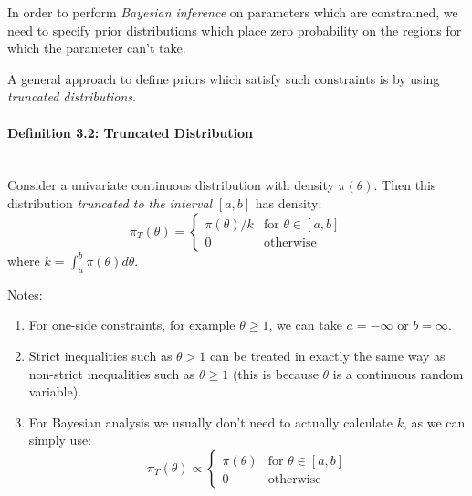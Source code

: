 In order to perform \emph{Bayesian inference} on parameters which are constrained, we need to specify prior distributions which place zero probability on the regions for which the parameter can't take. 




A general approach to define priors which satisfy such constraints is by using \emph{truncated distributions}.

\paragraph{Definition 3.2: Truncated Distribution}{~\\
  Consider a univariate continuous distribution with density $\pi(\theta)$.
  Then this distribution \emph{truncated to the interval} $[a,b]$ has density:
  $$
  \pi_T(\theta) =
    \begin{cases}
      \pi(\theta) / k & \text{for } \theta \in [a,b] \\
      0 & \text{otherwise}
    \end{cases}
  $$
  where $k = \int_a^b \pi(\theta) d\theta$.}

Notes:
\begin{enumerate}
\item
For one-side constraints, for example $\theta \geq 1$, we can take $a=-\infty$ or $b=\infty$.
\item
Strict inequalities such as $\theta>1$ can be treated in exactly the same way as non-strict inequalities such as $\theta \geq 1$ (this is because $\theta$ is a continuous random variable).
\item
For Bayesian analysis we usually don't need to actually calculate $k$, as we can simply use:
$$
\pi_T(\theta) \propto
  \begin{cases}
    \pi(\theta) & \text{for } \theta \in [a,b] \\
    0 & \text{otherwise}
  \end{cases}
$$
\end{enumerate}
\clearpage
